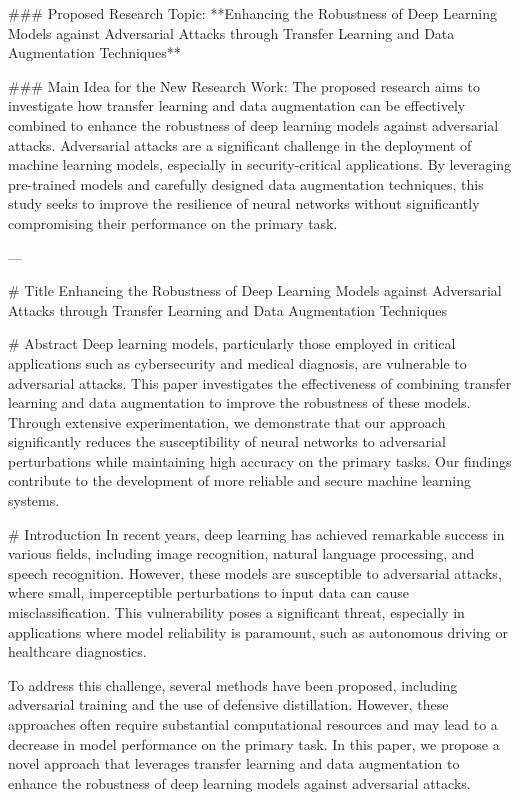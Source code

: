 ### Proposed Research Topic:
**Enhancing the Robustness of Deep Learning Models against Adversarial Attacks through Transfer Learning and Data Augmentation Techniques**

### Main Idea for the New Research Work:
The proposed research aims to investigate how transfer learning and data augmentation can be effectively combined to enhance the robustness of deep learning models against adversarial attacks. Adversarial attacks are a significant challenge in the deployment of machine learning models, especially in security-critical applications. By leveraging pre-trained models and carefully designed data augmentation techniques, this study seeks to improve the resilience of neural networks without significantly compromising their performance on the primary task.

---

# Title
Enhancing the Robustness of Deep Learning Models against Adversarial Attacks through Transfer Learning and Data Augmentation Techniques

# Abstract
Deep learning models, particularly those employed in critical applications such as cybersecurity and medical diagnosis, are vulnerable to adversarial attacks. This paper investigates the effectiveness of combining transfer learning and data augmentation to improve the robustness of these models. Through extensive experimentation, we demonstrate that our approach significantly reduces the susceptibility of neural networks to adversarial perturbations while maintaining high accuracy on the primary tasks. Our findings contribute to the development of more reliable and secure machine learning systems.

# Introduction
In recent years, deep learning has achieved remarkable success in various fields, including image recognition, natural language processing, and speech recognition. However, these models are susceptible to adversarial attacks, where small, imperceptible perturbations to input data can cause misclassification. This vulnerability poses a significant threat, especially in applications where model reliability is paramount, such as autonomous driving or healthcare diagnostics.

To address this challenge, several methods have been proposed, including adversarial training and the use of defensive distillation. However, these approaches often require substantial computational resources and may lead to a decrease in model performance on the primary task. In this paper, we propose a novel approach that leverages transfer learning and data augmentation to enhance the robustness of deep learning models against adversarial attacks.

